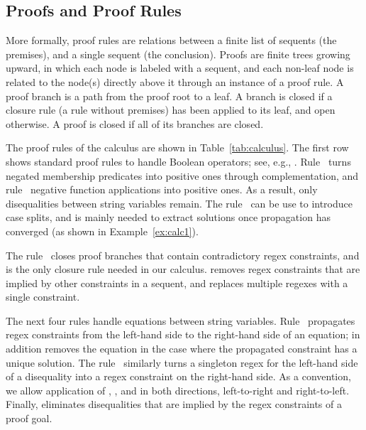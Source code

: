\subsection{Proofs and Proof Rules}
\label{sec:rules}

More formally, proof rules are relations between a finite list of
sequents (the premises), and a single sequent (the conclusion). Proofs
are finite trees growing upward, in which each node is labeled with a
sequent, and each non-leaf node is related to the node(s) directly
above it through an instance of a proof rule. A proof branch is a path
from the proof root to a leaf. A branch is closed if a closure rule (a
rule without premises) has been applied to its leaf, and open
otherwise. A proof is closed if all of its branches are closed.

The proof rules of the calculus are shown in
Table~\ref{tab:calculus}. The first row shows standard proof rules to
handle Boolean operators; see, e.g.,
\cite{DBLP:books/daglib/0022394}. Rule~ turns
negated membership predicates into positive ones through
complementation, and rule~ negative function
applications into positive ones. As a result, only disequalities
between string variables remain. The rule~ can be use to
introduce case splits, and is mainly needed to extract solutions once
propagation has converged (as shown in Example~\ref{ex:calc1}).

The rule~ closes proof branches that contain
contradictory regex constraints, and is the only closure rule needed
in our calculus.  removes regex constraints
that are implied by other constraints in a sequent, and
 replaces multiple regexes with a single
constraint.

The next four rules handle equations between string
variables. Rule~ propagates regex constraints from
the left-hand side to the right-hand side of an equation;
 in addition removes the equation in the case
where the propagated constraint has a unique solution. The
rule~ similarly turns a singleton regex
for the left-hand side of a disequality into a regex constraint on the
right-hand side.  As a convention, we allow application of
, , and
 in both directions, left-to-right and
right-to-left. Finally,  eliminates
disequalities that are implied by the regex constraints of a proof
goal.

